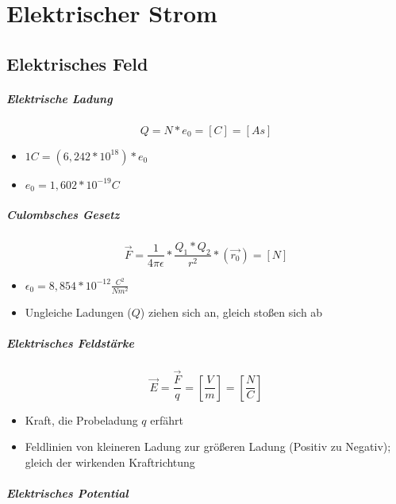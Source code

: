 \chapter{Elektrischer Strom}


\section{Elektrisches Feld}

\paragraph{Elektrische Ladung}

$$Q = N * e_0 = [C] = [As]$$

\begin{itemize}
  \item $1C = (6,242 * 10^{18}) * e_0$
  \item $e_0 = 1,602 * 10^{-19} C$
\end{itemize}

\paragraph{Culombsches Gesetz}

$$\vec{F} = \frac{1}{4 \pi \epsilon} * \frac{Q_1 * Q_2}{r^2} * (\vec{r_0}) = [N]$$

\begin{itemize}
  \item $\epsilon_0 = 8,854 * 10^{-12} \frac{C^2}{Nm^2}$
  \item Ungleiche Ladungen ($Q$) ziehen sich an, gleich sto\ss en sich ab
\end{itemize}

\paragraph{Elektrisches Feldstärke}

$$\vec{E} = \frac{\vec{F}}{q} = \left[\frac{V}{m}\right] = \left[\frac{N}{C}\right]$$

\begin{itemize}
  \item Kraft, die Probeladung $q$ erfährt
  \item Feldlinien von kleineren Ladung zur grö\ss eren Ladung (Positiv zu Negativ); gleich der wirkenden Kraftrichtung
\end{itemize}

\paragraph{Elektrisches Potential}

